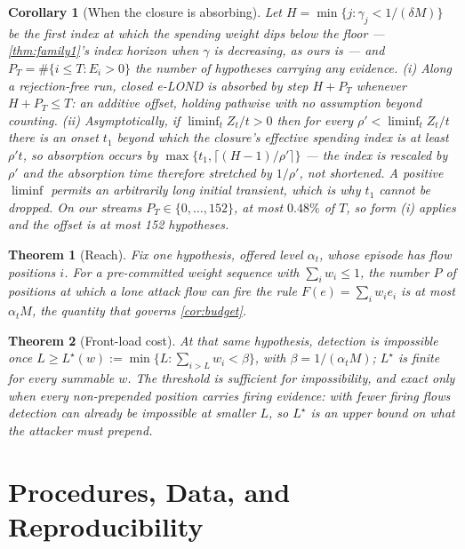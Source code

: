 \documentclass[conference]{IEEEtran}
\newtheorem{theorem}{Theorem}
\newtheorem{corollary}{Corollary}
\newcommand{\ceil}{M}
\newcommand{\alphat}{\alpha_t}
\begin{document}
\begin{corollary}[When the closure is absorbing]\label{cor:closureabsorb}
Let $H=\min\{j:\gamma_j<1/(\delta\ceil)\}$ be the first index at which the spending weight dips below
the floor --- \cref{thm:family1}'s index horizon when $\gamma$ is decreasing, as ours is --- and
$P_T=\#\{i\le T:E_i>0\}$ the number of hypotheses carrying any evidence. \emph{(i)} Along a
rejection-free run, closed e-LOND is absorbed by step $H+P_T$ whenever $H+P_T\le T$: an additive offset,
holding pathwise with no assumption beyond counting. \emph{(ii)} Asymptotically, if
$\liminf_t Z_t/t>0$ then for every $\rho'<\liminf_t Z_t/t$ there is an onset $t_1$ beyond which the
closure's effective spending index is at least $\rho' t$, so absorption occurs by
$\max\{t_1,\lceil(H-1)/\rho'\rceil\}$ --- the index is rescaled by $\rho'$ and the absorption
\emph{time} therefore stretched by $1/\rho'$, not shortened. A positive $\liminf$ permits an
arbitrarily long initial transient, which is why $t_1$ cannot be dropped. On our streams $P_T\in\{0,\ldots,152\}$, at most $0.48\%$ of
$T$, so form (i) applies and the offset is at most 152 hypotheses.
\end{corollary}

\begin{theorem}[Reach]\label{thm:reach}
Fix one hypothesis, offered level $\alphat$, whose episode has flow positions $i$. For a pre-committed
weight sequence with $\sum_iw_i\le1$, the number $P$ of positions at which a lone attack flow can fire
the rule $F(e)=\sum_iw_ie_i$ is at most $\alphat\ceil$, the quantity that governs \cref{cor:budget}.
\end{theorem}

\begin{theorem}[Front-load cost]\label{thm:frontload}
At that same hypothesis, detection is impossible once $L\ge L^{\star}(w):=\min\{L:\sum_{i>L}w_i<\beta\}$,
with $\beta=1/(\alphat\ceil)$; $L^{\star}$ is finite for every summable $w$. The threshold is \emph{sufficient}
for impossibility, and exact only when every non-prepended position carries firing evidence: with fewer
firing flows detection can already be impossible at smaller $L$, so $L^{\star}$ is an upper bound on what
the attacker must prepend.
\end{theorem}



\section{Procedures, Data, and Reproducibility}\label{app:procedures}\label{app:data}
\end{document}
